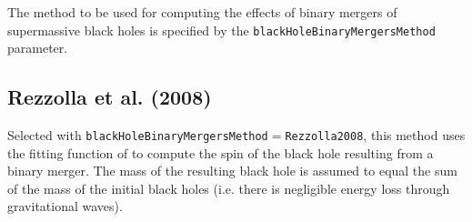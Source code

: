 The method to be used for computing the effects of binary mergers of supermassive black holes is specified by the {\tt blackHoleBinaryMergersMethod} parameter.

\subsection{Rezzolla et al. (2008)}

Selected with {\tt blackHoleBinaryMergersMethod}$=${\tt Rezzolla2008}, this method uses the fitting function of \cite{rezzolla_final_2008} to compute the spin of the black hole resulting from a binary merger. The mass of the resulting black hole is assumed to equal the sum of the mass of the initial black holes (i.e. there is negligible energy loss through gravitational waves).

